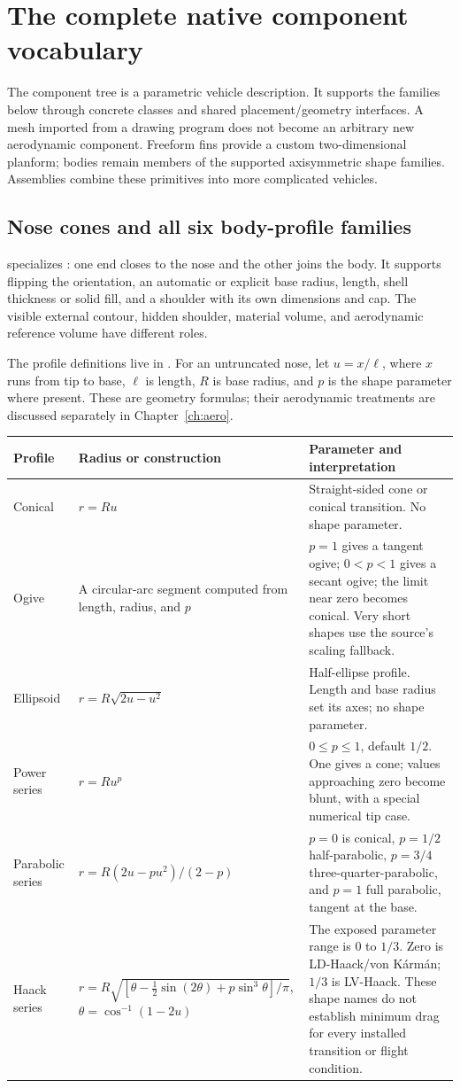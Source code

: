 \section{The complete native component vocabulary}\label{sec:catalogue}
The component tree is a parametric vehicle description. It supports the families below through concrete classes and shared placement/geometry interfaces. A mesh imported from a drawing program does not become an arbitrary new aerodynamic component. Freeform fins provide a custom two-dimensional planform; bodies remain members of the supported axisymmetric shape families. Assemblies combine these primitives into more complicated vehicles.

\subsection{Nose cones and all six body-profile families}
 specializes : one end closes to the nose and the other joins the body. It supports flipping the orientation, an automatic or explicit base radius, length, shell thickness or solid fill, and a shoulder with its own dimensions and cap. The visible external contour, hidden shoulder, material volume, and aerodynamic reference volume have different roles.

The profile definitions live in . For an untruncated nose, let $u=x/\ell$, where $x$ runs from tip to base, $\ell$ is length, $R$ is base radius, and $p$ is the shape parameter where present. These are geometry formulas; their aerodynamic treatments are discussed separately in Chapter~\ref{ch:aero}.

\begin{tabularx}{\linewidth}{@{}L{2.2cm}L{5.8cm}Y@{}}\toprule
Profile & Radius or construction & Parameter and interpretation\\\midrule
Conical & $r=Ru$ & Straight-sided cone or conical transition. No shape parameter.\\
Ogive & A circular-arc segment computed from length, radius, and $p$ & $p=1$ gives a tangent ogive; $0<p<1$ gives a secant ogive; the limit near zero becomes conical. Very short shapes use the source's scaling fallback.\\
Ellipsoid & $r=R\sqrt{2u-u^2}$ & Half-ellipse profile. Length and base radius set its axes; no shape parameter.\\
Power series & $r=Ru^p$ & $0\leq p\leq1$, default $1/2$. One gives a cone; values approaching zero become blunt, with a special numerical tip case.\\
Parabolic series & $r=R(2u-pu^2)/(2-p)$ & $p=0$ is conical, $p=1/2$ half-parabolic, $p=3/4$ three-quarter-parabolic, and $p=1$ full parabolic, tangent at the base.\\
Haack series & $r=R\sqrt{[\theta-\tfrac12\sin(2\theta)+p\sin^3\theta]/\pi}$, $\theta=\cos^{-1}(1-2u)$ & The exposed parameter range is $0$ to $1/3$. Zero is LD-Haack/von K\'arm\'an; $1/3$ is LV-Haack. These shape names do not establish minimum drag for every installed transition or flight condition.\\\bottomrule
\end{tabularx}


